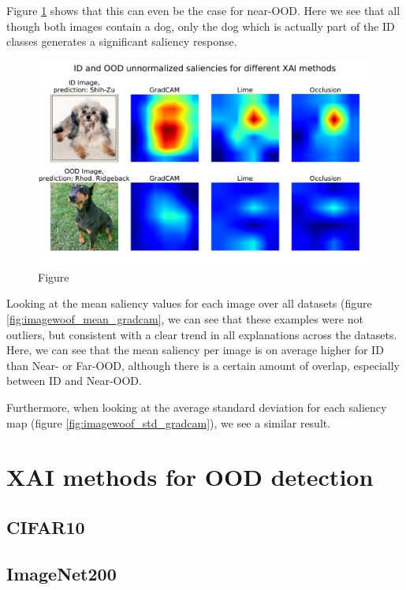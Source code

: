 \documentclass[UKenglish]{uiomasterthesis} %
\theoremstyle{definition}
\begin{document}
Figure \ref{fig:imagewoof_unnorm_stan} shows that this can even be the case for near-OOD. Here we see that all though both images contain a dog, only the dog which is actually part of the ID classes generates a significant saliency response.

\begin{figure}[ht]
\centerline{\includegraphics[width=6.25in]{figure/imagewoof_unnormalized_sal_stanford.pdf}}
\caption{Figure}
\label{fig:imagewoof_unnorm_stan}
\end{figure}

Looking at the mean saliency values for each image over all datasets (figure \ref{fig:imagewoof_mean_gradcam}, we can see that these examples were not outliers, but consistent with a clear trend in all explanations across the datasets. Here, we can see that the mean saliency per image is on average higher for ID than Near- or Far-OOD, although there is a certain amount of overlap, especially between ID and Near-OOD.

Furthermore, when looking at the average standard deviation for each saliency map (figure \ref{fig:imagewoof_std_gradcam}), we see a similar result.


\section{XAI methods for OOD detection}

\subsection{CIFAR10}

\subsection{ImageNet200}
\end{document}
